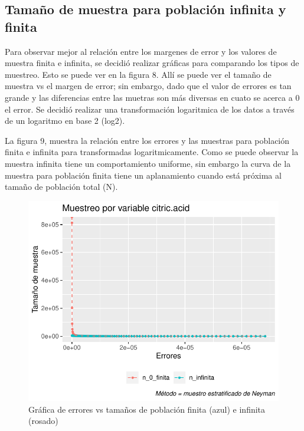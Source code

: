 \documentclass[
]{article}
\begin{document}
\hypertarget{tamauxf1o-de-muestra-para-poblaciuxf3n-infinita-y-finita}{%
\subsection{Tamaño de muestra para población infinita y
finita}\label{tamauxf1o-de-muestra-para-poblaciuxf3n-infinita-y-finita}}

Para observar mejor al relación entre los margenes de error y los
valores de muestra finita e infinita, se decidió realizar gráficas para
comparando los tipos de muestreo. Esto se puede ver en la figura 8. Allí
se puede ver el tamaño de muestra vs el margen de error; sin embargo,
dado que el valor de errores es tan grande y las diferencias entre las
muetras son más diversas en cuato se acerca a 0 el error. Se decidió
realizar una transformación logaritmica de los datos a través de un
logaritmo en base 2 (log2).

La figura 9, muestra la relación entre los errores y las muestras para
población finita e infinita para transformadas logaritmicamente. Como se
puede observar la muestra infinita tiene un comportamiento uniforme, sin
embargo la curva de la muestra para población finita tiene un
aplanamiento cuando está próxima al tamaño de población total (N).

\begin{figure}
\centering
\includegraphics{muestreo_estratificado_final_files/figure-latex/grap uno de errores-1.pdf}
\caption{Gráfica de errores vs tamaños de población finita (azul) e
infinita (rosado)}
\end{figure}
\end{document}
